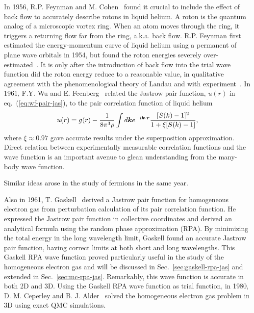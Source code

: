 In 1956, R.P. Feynman and M. Cohen~\cite{Feynman1956} found it crucial to include the effect of back flow to accurately describe rotons in liquid helium. A roton is the quantum analog of a microscopic vortex ring. When an atom moves through the ring, it triggers a returning flow far from the ring, a.k.a. back flow. R.P. Feynman first estimated the energy-momentum curve of liquid helium using a permanent of plane wave orbitals in 1954, but found the roton energies severely over-estimated~\cite{Feynman1954}. It is only after the introduction of back flow into the trial wave function did the roton energy reduce to a reasonable value, in qualitative agreement with the phenomenological theory of Landau and with experiment~\cite{Feynman1956}.
In 1961, F.Y. Wu and E. Feenberg~\cite{Wu1961} related the Jastrow pair function, $u(r)$ in eq.~(\ref{eq:wf-pair-jas}), to the pair correlation function of liquid helium
\begin{align}
u(r) = g(r) - \dfrac{1}{8\pi^3\rho}\int d\boldsymbol{k} e^{-i\boldsymbol{k}\cdot\boldsymbol{r}}
\dfrac{[S(k)-1]^2}{1+\xi[S(k)-1]},
\end{align}
where $\xi\approx0.97$ gave accurate results under the superposition approximation.
Direct relation between experimentally measurable correlation functions and the wave function is an important avenue to glean understanding from the many-body wave function.
\begin{comment}
Wu and Feenberg also wrote down expectation values of kinetic and potential operators
\begin{align}
\braket{T} = \frac{1}{2}\dfrac{N\rho}{2}\dfrac{\hbar^2}{2m} \int d\bs{r} g'(\bs{r}) u'(\bs{r}), \\
\braket{V} = \frac{1}{2} N\rho\int d\bs{r} g(\bs{r}) v(\bs{r}),
\end{align}
for non-relativistic particles having mass $m$ and interacting via a pair potential $v(\bs{r})$. These relations will later prove useful for the study of finite-size effects using the wave function.
\end{comment}
Similar ideas arose in the study of fermions in the same year.

Also in 1961, T. Gaskell~\cite{Gaskell1961} derived a Jastrow pair function for homogeneous electron gas from perturbation calculation of its pair correlation function. He expressed the Jastrow pair function in collective coordinates and derived an analytical formula using the random phase approximation (RPA). By minimizing the total energy in the long wavelength limit, Gaskell found an accurate Jastrow pair function, having correct limits at both short and long wavelengths.
This Gaskell RPA wave function proved particularly useful in the study of the homogeneous electron gas and will be discussed in Sec.~\ref{sec:gaskell-rpa-jas} and extended in Sec.~\ref{sec:mc-rpa-jas}.
Remarkably, this wave function is accurate in both 2D and 3D.
Using the Gaskell RPA wave function as trial function, in 1980, D. M. Ceperley and B. J. Alder~\cite{Ceperley1980} solved the homogeneous electron gas problem in 3D using exact QMC simulations.

